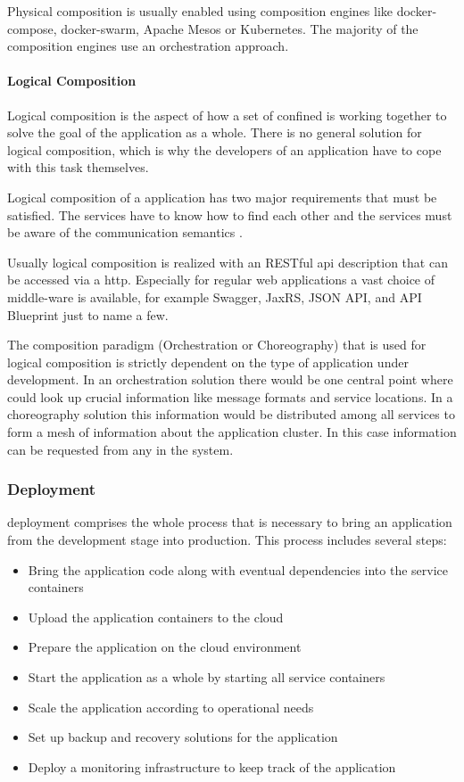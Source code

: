 Physical composition is usually enabled using composition engines like
docker-compose, docker-swarm, Apache Mesos or Kubernetes. The majority of the
composition engines use an orchestration approach.

\paragraph{Logical Composition}

Logical composition is the aspect of how a set of confined \mss{} is working
together to solve the goal of the application as a whole. There is no
general solution for logical composition, which is why the developers of an
application have to cope with this task themselves.

Logical composition of a \ms{} application has two major requirements that must
be satisfied. The services have to know how to find each other
\cite{rotter2017telecom} and the services must be aware of the communication
semantics \cite{oberhauser2016microflows}.

Usually logical composition is realized with an RESTful \gls{api} description
that can be accessed via a \gls{http}. Especially for regular web applications a
vast choice of middle-ware is available, for example Swagger, JaxRS, JSON API,
and API Blueprint just to name a few.

The composition paradigm (Orchestration or Choreography) that is used for
logical composition is strictly dependent on the type of application under
development. In an orchestration solution there would be one central point where
\mss{} could look up crucial information like message formats and service
locations. In a choreography solution this information would be distributed
among all services to form a mesh of information about the application cluster.
In this case information can be requested from any \ms{} in the system.

\subsubsection{\msuc{} Deployment}

\msuc{} deployment comprises the whole process that is necessary to bring an
application from the development stage into production. This process includes
several steps:

\begin{itemize}
  \item Bring the application code along with eventual dependencies into the
  service containers
  \item Upload the application containers to the cloud
  \item Prepare the application on the cloud environment
  \item Start the application as a whole by starting all service containers
  \item Scale the application according to operational needs
  \item Set up backup and recovery solutions for the application
  \item Deploy a monitoring infrastructure to keep track of the application
\end{itemize}

